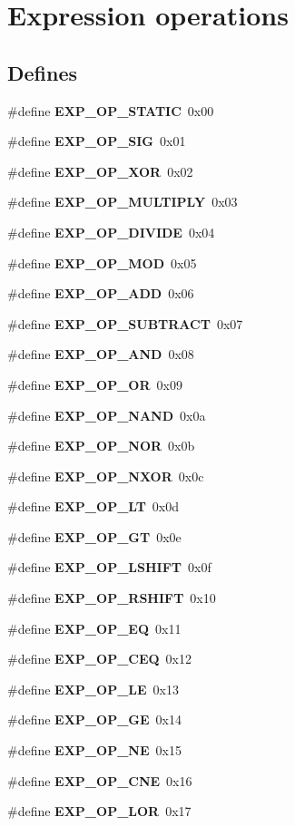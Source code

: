 \section{Expression operations}
\label{group__expr__ops}
\subsection*{Defines}
\begin{CompactItemize}
\item 
\#define {\bf EXP\_\-OP\_\-STATIC}\ 0x00
\item 
\#define {\bf EXP\_\-OP\_\-SIG}\ 0x01
\item 
\#define {\bf EXP\_\-OP\_\-XOR}\ 0x02
\item 
\#define {\bf EXP\_\-OP\_\-MULTIPLY}\ 0x03
\item 
\#define {\bf EXP\_\-OP\_\-DIVIDE}\ 0x04
\item 
\#define {\bf EXP\_\-OP\_\-MOD}\ 0x05
\item 
\#define {\bf EXP\_\-OP\_\-ADD}\ 0x06
\item 
\#define {\bf EXP\_\-OP\_\-SUBTRACT}\ 0x07
\item 
\#define {\bf EXP\_\-OP\_\-AND}\ 0x08
\item 
\#define {\bf EXP\_\-OP\_\-OR}\ 0x09
\item 
\#define {\bf EXP\_\-OP\_\-NAND}\ 0x0a
\item 
\#define {\bf EXP\_\-OP\_\-NOR}\ 0x0b
\item 
\#define {\bf EXP\_\-OP\_\-NXOR}\ 0x0c
\item 
\#define {\bf EXP\_\-OP\_\-LT}\ 0x0d
\item 
\#define {\bf EXP\_\-OP\_\-GT}\ 0x0e
\item 
\#define {\bf EXP\_\-OP\_\-LSHIFT}\ 0x0f
\item 
\#define {\bf EXP\_\-OP\_\-RSHIFT}\ 0x10
\item 
\#define {\bf EXP\_\-OP\_\-EQ}\ 0x11
\item 
\#define {\bf EXP\_\-OP\_\-CEQ}\ 0x12
\item 
\#define {\bf EXP\_\-OP\_\-LE}\ 0x13
\item 
\#define {\bf EXP\_\-OP\_\-GE}\ 0x14
\item 
\#define {\bf EXP\_\-OP\_\-NE}\ 0x15
\item 
\#define {\bf EXP\_\-OP\_\-CNE}\ 0x16
\item 
\#define {\bf EXP\_\-OP\_\-LOR}\ 0x17
\item 

\end{CompactItemize}
